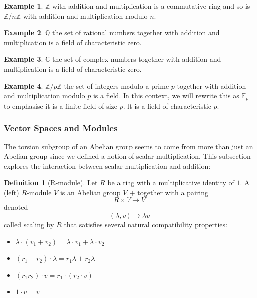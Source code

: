 \documentclass{article}
\theoremstyle{definition}
\newtheorem{definition}{Definition}[section]
\theoremstyle{definition}
\theoremstyle{definition}
\newtheorem{eg}{Example}[section]
\newcommand{\C}{\mathbb{C}}
\newcommand{\Z}{\mathbb{Z}}
\newcommand{\Q}{\mathbb{Q}}
\begin{document}
\begin{eg}
    $\Z$ with addition and multiplication is a commutative ring and so is $\Z/n\Z$ with addition and multiplication modulo $n$.
\end{eg}





\begin{eg} $\Q$ the set of rational numbers together with addition and multiplication is a field of characteristic zero.
\end{eg}

\begin{eg}  $\C$ the set of complex  numbers together with addition and multiplication is a field of characteristic zero.
\end{eg} 

\begin{eg} $\Z/p\Z$ the set of integers modulo a prime $p$ together with addition and multiplication modulo $p$ is a field. In this context, we will rewrite this as $\mathbb{F}_p$ to emphasise it is a finite field of size $p$. It is a field of characteristic $p$.
\end{eg} 
\subsubsection{Vector Spaces and Modules}

The torsion subgroup of an Abelian group seems to come from more than just an Abelian group since we defined a notion of scalar multiplication.
\newline\newline
This subsection explores the interaction between scalar multiplication and addition:






\begin{definition}[R-module] Let $R$ be a ring with a multiplicative identity of $1$. A (left) $R$-module $V$ is an Abelian group $V,+$ together with a pairing
$$R\times V\to V$$
denoted
$$(\lambda, v)\mapsto \lambda v$$
called scaling by $R$ that satisfies several natural compatibility properties: 
\begin{itemize}
    \item $\lambda\cdot(v_1+v_2)=\lambda\cdot v_1+\lambda\cdot v_2$
    \item $(r_1+r_2)\cdot \lambda=r_1\lambda+r_2\lambda$
    \item $(r_1r_2)\cdot v=r_1\cdot(r_2\cdot v)$
    \item $1\cdot v= v$
\end{itemize}
\end{definition}
\end{document}
